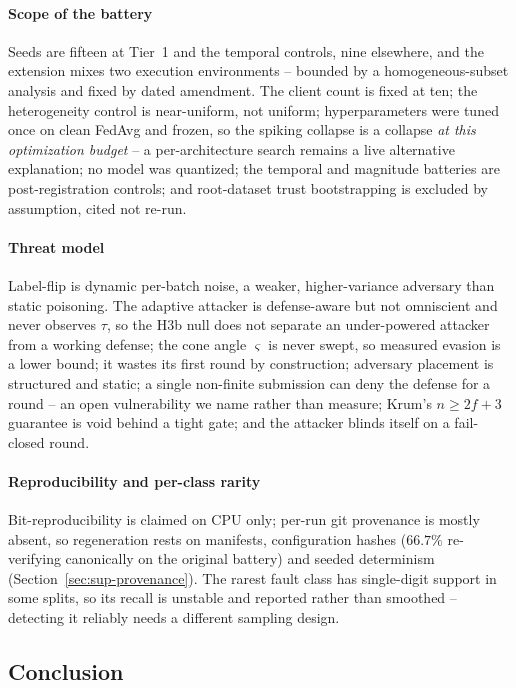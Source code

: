 \paragraph{Scope of the battery}
Seeds are fifteen at Tier~1 and the temporal controls, nine elsewhere,
and the extension mixes two execution environments -- bounded by a
homogeneous-subset analysis and fixed by dated amendment. The client
count is fixed at ten; the heterogeneity control is near-uniform, not
uniform; hyperparameters were tuned once on clean FedAvg and frozen, so
the spiking collapse is a collapse \emph{at this optimization budget} --
a per-architecture search remains a live alternative explanation; no
model was quantized; the temporal and magnitude batteries are
post-registration controls; and root-dataset trust bootstrapping
\cite{cao2021fltrust} is excluded by assumption, cited not re-run.

\paragraph{Threat model}
Label-flip is dynamic per-batch noise, a weaker, higher-variance
adversary than static poisoning. The adaptive attacker is defense-aware
but not omniscient and never observes $\tau$, so the H3b null does not
separate an under-powered attacker from a working defense; the cone
angle $\varsigma$ is never swept, so measured evasion is a lower bound;
it wastes its first round by construction; adversary placement is
structured and static; a single non-finite submission can deny the
defense for a round -- an open vulnerability we name rather than
measure; Krum's $n \ge 2f+3$ guarantee is void behind a tight gate; and
the attacker blinds itself on a fail-closed round.

\paragraph{Reproducibility and per-class rarity}
Bit-reproducibility is claimed on CPU only; per-run git provenance is
mostly absent, so regeneration rests on manifests, configuration hashes
($66.7\%$ re-verifying canonically on the original battery) and seeded
determinism (Section~\ref{sec:sup-provenance}). The rarest fault class
has single-digit support in some splits, so its recall is unstable and
reported rather than smoothed -- detecting it reliably needs a different
sampling design.

\subsection{Conclusion}
\label{sec:conclusion}

